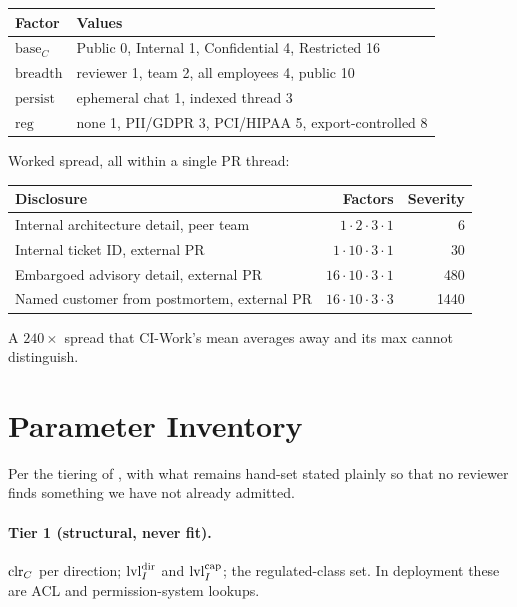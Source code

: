 \begin{center}
\footnotesize
\begin{tabular}{@{}ll@{}}
\toprule
\textbf{Factor} & \textbf{Values} \\
\midrule
$\mathrm{base}_C$ & Public 0, Internal 1, Confidential 4, Restricted 16 \\
$\mathrm{breadth}$ & reviewer 1, team 2, all employees 4, public 10 \\
$\mathrm{persist}$ & ephemeral chat 1, indexed thread 3 \\
$\mathrm{reg}$ & none 1, PII/GDPR 3, PCI/HIPAA 5, export-controlled 8 \\
\bottomrule
\end{tabular}
\end{center}

\noindent Worked spread, all within a single PR thread:

\begin{center}
\footnotesize
\begin{tabular}{@{}lrr@{}}
\toprule
\textbf{Disclosure} & \textbf{Factors} & \textbf{Severity} \\
\midrule
Internal architecture detail, peer team & $1\cdot2\cdot3\cdot1$ & 6 \\
Internal ticket ID, external PR & $1\cdot10\cdot3\cdot1$ & 30 \\
Embargoed advisory detail, external PR & $16\cdot10\cdot3\cdot1$ & 480 \\
Named customer from postmortem, external PR & $16\cdot10\cdot3\cdot3$ & 1440 \\
\bottomrule
\end{tabular}
\end{center}

\noindent A $240\times$ spread that CI-Work's mean averages away and its max
cannot distinguish.

\section{Parameter Inventory}
\label{app:params}

Per the tiering of , with what remains hand-set stated
plainly so that no reviewer finds something we have not already admitted.

\paragraph{Tier 1 (structural, never fit).} $\mathrm{clr}_C$ per direction;
$\mathrm{lvl}_I^{\mathrm{dir}}$ and $\mathrm{lvl}_I^{\mathrm{cap}}$; the regulated-class set.
In deployment these are ACL and permission-system lookups.

